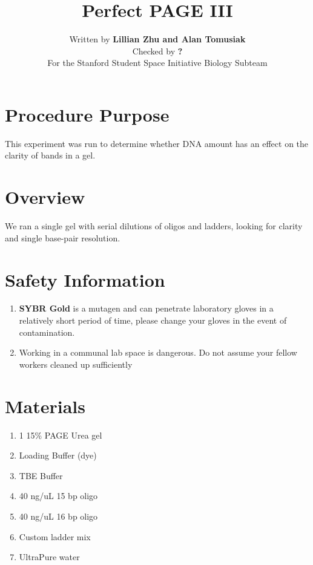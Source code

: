 \documentclass[letterpaper]{article}
\title{Perfect PAGE III} %
\author{Written by \textbf{Lillian Zhu and Alan Tomusiak}\\ %
		Checked by \textbf{?}\\ %
        For the Stanford Student Space Initiative Biology Subteam}
\newenvironment{safety}{%
\begin{tcolorbox}[width=\textwidth, colframe=safetyFrame, arc=1.5mm]
}%
{\end{tcolorbox}}
\newcommand{\uL}{\micro{}L}
\newcommand{\B}[1]{\textbf{#1}}
\newcommand{\SYBRGold}{\item{\B{SYBR Gold} is a mutagen and can penetrate laboratory gloves in a relatively short period of time, please change your gloves in the event of contamination.
}}
\newcommand{\Dilution}[4]{
\subsection{#2}
\begin{enumerate}
\item{Vortex #2 stock}
\item{Pipette #1\uL{} #2 into a PCR Tube}
\item{Pipette #3\uL{} #4 into solution}
\item{Vortex until mixed}
\end{enumerate}
}
\begin{document}
\maketitle

\section{Procedure Purpose} %
This experiment was run to determine whether DNA amount has an effect on the clarity of bands in a gel.

\section{Overview} %
We ran a single gel with serial dilutions of oligos and ladders, looking for clarity and single base-pair resolution.
\\

\section{Safety Information}
\begin{safety}
\begin{enumerate}
\SYBRGold{} %
\item{Working in a communal lab space is dangerous. Do not assume your fellow workers cleaned up sufficiently}
\end{enumerate}
\end{safety}


\section{Materials}
\begin{enumerate}
\item{1 15\% PAGE Urea gel}
\item{Loading Buffer (dye)}
\item{TBE Buffer}
\item{40 ng/uL 15 bp oligo}
\item{40 ng/uL 16 bp oligo}
\item{Custom ladder mix}
\item{UltraPure water}
\end{enumerate}

\end{document}
